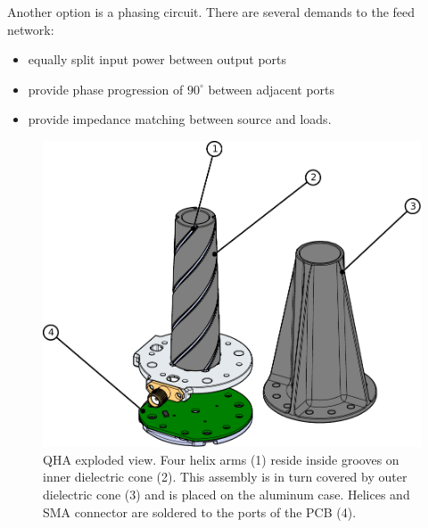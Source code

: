 \documentclass{IEEEtran}
\begin{document}
Another option is a phasing circuit. There are several demands to the feed network:
\begin{itemize}
\item equally split input power between output ports
\item provide phase progression of $90^{\circ}$ between adjacent ports
\item provide impedance matching between source and loads.
\end{itemize}

\begin{figure}
  \centering
  \centerline{\includegraphics[width=0.95\linewidth]{images/QHA_Exploded}}
  \caption{QHA exploded view. Four helix arms (1) reside inside grooves on inner dielectric cone
    (2). This assembly is in turn covered by outer dielectric cone (3) and is placed on the aluminum
    case. Helices and SMA connector are soldered to the ports of the PCB (4).}
  \label{fig:exploded_view}
\end{figure}
\end{document}

